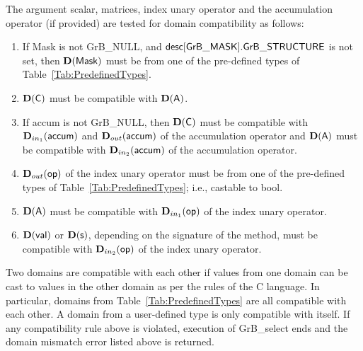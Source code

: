 The argument scalar, matrices, index unary operator and the accumulation 
operator (if provided) are tested for domain compatibility as follows:
\begin{enumerate}
    \item If {\sf Mask} is not {\sf GrB\_NULL}, and ${\sf desc[GrB\_MASK].GrB\_STRUCTURE}$
    is not set, then $\bold{D}({\sf Mask})$ must be from one of the pre-defined types of 
    Table~\ref{Tab:PredefinedTypes}.

    \item $\bold{D}({\sf C})$ must be compatible with $\bold{D}({\sf A})$.

    \item If {\sf accum} is not {\sf GrB\_NULL}, then $\bold{D}({\sf C})$ must be
    compatible with $\mbox{$\mathbf{D}_{in_{1}}$}({\sf accum})$ and $\mbox{$\mathbf{D}_{out}$}({\sf accum})$ of the accumulation operator and 
    $\bold{D}({\sf A})$ must be compatible with $\mbox{$\mathbf{D}_{in_{2}}$}({\sf accum})$ of the accumulation operator.

	\item $\mbox{$\mathbf{D}_{out}$}({\sf op})$ of the index unary operator must be from one of the pre-defined types of 
    Table~\ref{Tab:PredefinedTypes}; i.e., castable to {\sf bool}.

    \item $\bold{D}({\sf A})$ must be compatible with $\mbox{$\mathbf{D}_{in_{1}}$}({\sf op})$ of the index unary operator.
    
    \item $\bold{D}({\sf val})$ or $\bold{D}({\sf s})$, depending on the signature of the method,
    must be compatible with $\mbox{$\mathbf{D}_{in_{2}}$}({\sf op})$ of the index unary operator.
\end{enumerate}

Two domains are compatible with each other if values from one domain can be cast 
to values in the other domain as per the rules of the C language.
In particular, domains from Table~\ref{Tab:PredefinedTypes} are all compatible 
with each other. A domain from a user-defined type is only compatible with itself.
If any compatibility rule above is violated, execution of {\sf GrB\_select} ends and 
the domain mismatch error listed above is returned.

